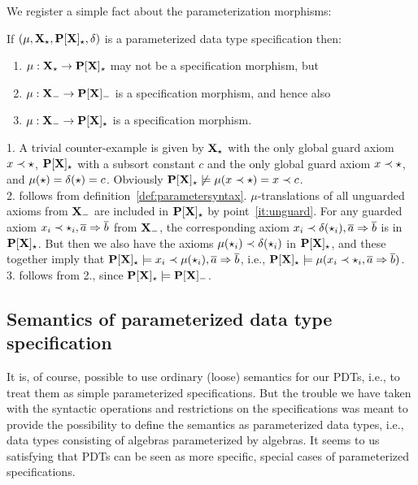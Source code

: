We register a simple fact about the parameterization morphisms:
\begin{fact}\label{fa:weakparamo}
If $(\mu,{\bf X_\star},{\bf P[X]_\star},\delta)$
is a parameterized data type
specification then:
\begin{enumerate}\MyLPar
\item $\mu: {\bf X_\star} \to {\bf P[X]_\star}$ may not be a specification morphism, but
\item $\mu: {\bf X_-} \to {\bf P[X]_-}$ is a specification morphism,
and hence also
\item $\mu: {\bf X_-} \to {\bf P[X]_\star}$ is a specification morphism.
\end{enumerate}
\end{fact}
\begin{PROOF}
1. A trivial counter-example is given by ${\bf X_\star}$ with the only global
   guard axiom $x\prec\star$, ${\bf P[X]_\star}$ with a subsort constant $c$ and
   the only global guard   axiom $x\prec\star$, and
   $\mu(\star)=\delta(\star)=c$. Obviously ${\bf P[X]_\star}\not\models
   \mu(x\prec\star)= x\prec c$.
\\[1ex]
2. follows from
definition~\ref{def:parametersyntax}. $\mu$-translations of all unguarded
axioms from ${\bf X_-}$ are included in ${\bf P[X]_\star}$ by
point~\ref{it:unguard}. For any guarded axiom $x_i\prec\star_i,\overline{a}\Rightarrow\overline{b}$ from ${\bf X_-}$, the corresponding axiom
$x_i\prec\delta(\star_i),\overline{a}\Rightarrow\overline{b}$ is in ${\bf P[X]_\star}$. But then
we also have the axioms $\mu(\star_i)\prec\delta(\star_i)$ in
${\bf P[X]_\star}$, and these together imply that 
${\bf P[X]_\star}\models x_i\prec\mu(\star_i),\overline{a}\Rightarrow\overline{b}$, i.e., 
${\bf P[X]_\star}\models \mu(x_i\prec \star_i,\overline{a}\Rightarrow\overline{b})$.
\\[1ex]
3. follows from 2., since ${\bf P[X]_\star}\models{\bf P[X]_-}$.
\end{PROOF}

\subsection{Semantics of parameterized data type specification}
It is, of course, possible to use ordinary (loose) semantics for our PDTs,
i.e., to treat them as simple parameterized specifications. 
But the trouble we have taken with the
syntactic operations and restrictions on the specifications was meant to
provide the possibility to define the semantics as 
parameterized data types, i.e., data types consisting of algebras parameterized
by algebras. It seems to us satisfying that PDTs can be seen as more
specific, special cases of parameterized specifications. 

